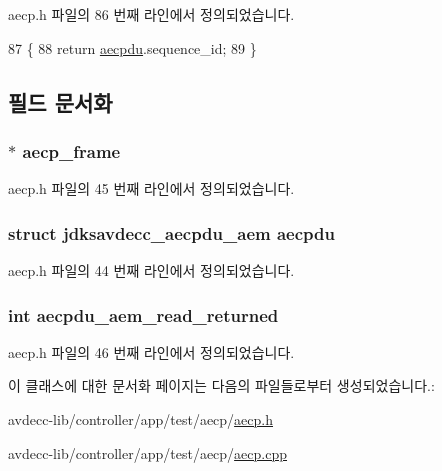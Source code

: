 aecp.\+h 파일의 86 번째 라인에서 정의되었습니다.


\begin{DoxyCode}
87         \{
88             \textcolor{keywordflow}{return} \hyperlink{classavdecc__lib_1_1aecp_a46b8ce55af795e99de50638b2540d78d}{aecpdu}.sequence\_id;
89         \}
\end{DoxyCode}


\subsection{필드 문서화}
\subsubsection[{\texorpdfstring{aecp\+\_\+frame}{aecp_frame}}]{$\ast$ aecp\+\_\+frame\hspace{0.3cm}{\ttfamily [private]}}\hypertarget{classavdecc__lib_1_1aecp_a41fc9e01707fd001e8eb58d6c2128f8c}{}\label{classavdecc__lib_1_1aecp_a41fc9e01707fd001e8eb58d6c2128f8c}


aecp.\+h 파일의 45 번째 라인에서 정의되었습니다.

\subsubsection[{\texorpdfstring{aecpdu}{aecpdu}}]{\setlength{\rightskip}{0pt plus 5cm}struct {\bf jdksavdecc\+\_\+aecpdu\+\_\+aem} aecpdu\hspace{0.3cm}{\ttfamily [private]}}\hypertarget{classavdecc__lib_1_1aecp_a46b8ce55af795e99de50638b2540d78d}{}\label{classavdecc__lib_1_1aecp_a46b8ce55af795e99de50638b2540d78d}


aecp.\+h 파일의 44 번째 라인에서 정의되었습니다.

\subsubsection[{\texorpdfstring{aecpdu\+\_\+aem\+\_\+read\+\_\+returned}{aecpdu_aem_read_returned}}]{\setlength{\rightskip}{0pt plus 5cm}int aecpdu\+\_\+aem\+\_\+read\+\_\+returned\hspace{0.3cm}{\ttfamily [private]}}\hypertarget{classavdecc__lib_1_1aecp_a30b853a4ad117cebc9ad63b505ec0c51}{}\label{classavdecc__lib_1_1aecp_a30b853a4ad117cebc9ad63b505ec0c51}


aecp.\+h 파일의 46 번째 라인에서 정의되었습니다.



이 클래스에 대한 문서화 페이지는 다음의 파일들로부터 생성되었습니다.\+:\begin{DoxyCompactItemize}
\item 
avdecc-\/lib/controller/app/test/aecp/\hyperlink{aecp_8h}{aecp.\+h}\item 
avdecc-\/lib/controller/app/test/aecp/\hyperlink{aecp_8cpp}{aecp.\+cpp}\end{DoxyCompactItemize}
